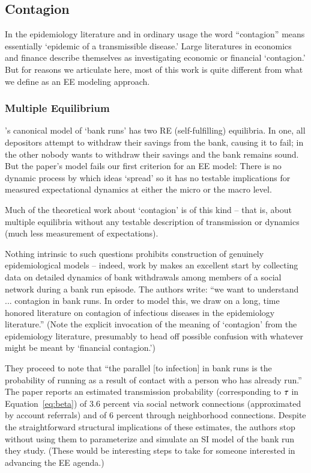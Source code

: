 
\subsection{Contagion}\label{subsec:Contagion}

In the epidemiology literature and in ordinary usage the word ``contagion'' means essentially `epidemic of a transmissible disease.'  Large literatures in economics and finance describe themselves as investigating economic or financial `contagion.'  But for reasons we articulate here, most of this work is quite different from what we define as an EE modeling approach.

\subsubsection{Multiple Equilibrium}\label{subsubsec:multipleEqulibrium}

\href{https://www.jstor.org/stable/1837095}{\cite{diamond_bank_1983}}'s canonical model of `bank runs' has two RE (self-fulfilling) equilibria.  In one, all depositors attempt to withdraw their savings from the bank, causing it to fail; in the other nobody wants to withdraw their savings and the bank remains sound.  But the paper's model fails our first criterion for an EE model: There is no dynamic process by which ideas `spread' so it has no testable implications for measured expectational dynamics at either the micro or the macro level.

Much of the theoretical work about `contagion' is of this kind -- that is, about multiple equilibria without any testable description of transmission or dynamics (much less measurement of expectations).

Nothing intrinsic to such questions prohibits construction of genuinely epidemiological models -- indeed, work by \cite{iyer2012understanding} makes an excellent start by collecting data on detailed dynamics of bank withdrawals among members of a social network during a bank run episode.  The authors write:
``we want to understand ... contagion in bank runs. In order to model this, we draw on a long, time honored literature on contagion of infectious diseases in the epidemiology literature.''   (Note the explicit invocation of the meaning of `contagion' from the epidemiology literature, presumably to head off possible confusion with whatever might be meant by `financial contagion.')

They proceed to note that ``the parallel [to infection] in bank runs is the probability of running as a result of contact with a person who has already run.''  The paper reports an estimated transmission probability (corresponding to  $\tranProb$ in Equation~\ref{eq:beta}) of 3.6 percent via social network connections (approximated by account referrals) and of 6 percent through neighborhood connections. Despite the straightforward structural implications of these estimates, the authors stop without using them to parameterize and simulate an SI model of the bank run they study. (These would be interesting steps to take for someone interested in advancing the EE agenda.)



